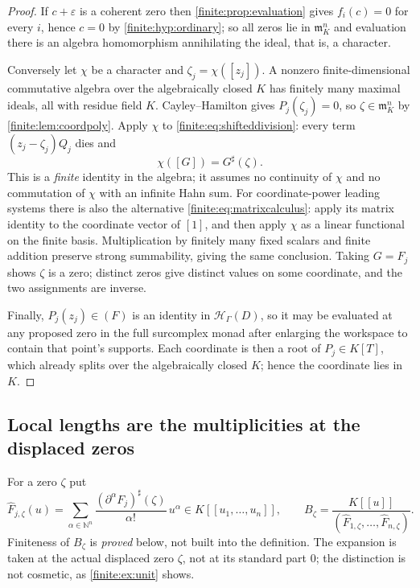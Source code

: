 \documentclass[11pt,letterpaper]{article}
\theoremstyle{definition}
\theoremstyle{remark}
\newcommand{\N}{\mathbb N}
\newcommand{\HH}{\mathscr H}
\newcommand{\mm}{\mathfrak m}
\newcommand{\sh}{^{\sharp}}
\numberwithin{equation}{section}
\begin{document}
\begin{proof}
If $c+\varepsilon$ is a coherent zero then \cref{finite:prop:evaluation} gives $f_i(c)=0$ for every $i$, hence $c=0$ by \cref{finite:hyp:ordinary}; so all zeros lie in $\mm_K^n$ and evaluation there is an algebra homomorphism annihilating the ideal, that is, a character.

Conversely let $\chi$ be a character and $\zeta_j=\chi([z_j])$. A nonzero finite-dimensional commutative algebra over the algebraically closed $K$ has finitely many maximal ideals, all with residue field $K$. Cayley--Hamilton gives $P_j(\zeta_j)=0$, so $\zeta\in\mm_K^n$ by \cref{finite:lem:coordpoly}. Apply $\chi$ to \eqref{finite:eq:shifteddivision}: every term $(z_j-\zeta_j)Q_j$ dies and
\[
 \chi([G])=G\sh(\zeta).
\]
This is a \emph{finite} identity in the algebra; it assumes no continuity of $\chi$ and no commutation of $\chi$ with an infinite Hahn sum. For coordinate-power leading systems there is also the alternative \eqref{finite:eq:matrixcalculus}: apply its matrix identity to the coordinate vector of $[1]$, and then apply $\chi$ as a linear functional on the finite basis. Multiplication by finitely many fixed scalars and finite addition preserve strong summability, giving the same conclusion. Taking $G=F_j$ shows $\zeta$ is a zero; distinct zeros give distinct values on some coordinate, and the two assignments are inverse.

Finally, $P_j(z_j)\in(F)$ is an identity in $\HH_\Gamma(D)$, so it may be evaluated at any proposed zero in the full surcomplex monad after enlarging the workspace to contain that point's supports. Each coordinate is then a root of $P_j\in K[T]$, which already splits over the algebraically closed $K$; hence the coordinate lies in $K$.
\end{proof}

\subsection{Local lengths are the multiplicities at the displaced zeros}
\label{finite:sec:lengths}

For a zero $\zeta$ put
\begin{equation}\label{finite:eq:localtaylor}
 \widehat F_{j,\zeta}(u)
 =\sum_{\alpha\in\N^n}\frac{(\partial^\alpha F_j)\sh(\zeta)}{\alpha!}\,u^\alpha
 \in K[[u_1,\ldots,u_n]],
 \qquad
 B_\zeta=\frac{K[[u]]}{(\widehat F_{1,\zeta},\ldots,\widehat F_{n,\zeta})} .
\end{equation}
Finiteness of $B_\zeta$ is \emph{proved} below, not built into the definition. The expansion is taken at the actual displaced zero $\zeta$, not at its standard part $0$; the distinction is not cosmetic, as \cref{finite:ex:unit} shows.
\end{document}
